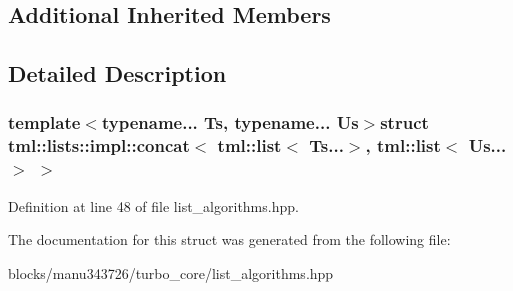 \subsection*{Additional Inherited Members}


\subsection{Detailed Description}
\subsubsection*{template$<$typename... Ts, typename... Us$>$struct tml\+::lists\+::impl\+::concat$<$ tml\+::list$<$ Ts...$>$, tml\+::list$<$ Us...$>$ $>$}



Definition at line 48 of file list\+\_\+algorithms.\+hpp.



The documentation for this struct was generated from the following file\+:\begin{DoxyCompactItemize}
\item 
blocks/manu343726/turbo\+\_\+core/list\+\_\+algorithms.\+hpp\end{DoxyCompactItemize}
